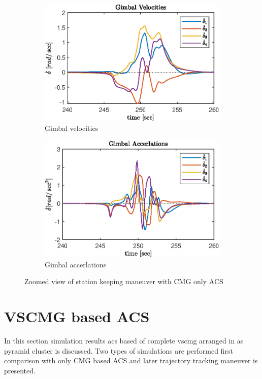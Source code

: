 \begin{figure}[H]
\begin{subfigure}[b]{0.49\columnwidth}
    \includegraphics[width=1\columnwidth]{figures/plots/CMG/cm_reg_w10_zoom_delta_dot.eps}
    \caption{Gimbal velocities}
    \label{plt:cm_reg_w10_zoom_delta_dot}
\end{subfigure}
  \begin{subfigure}[b]{0.49\columnwidth}
     \centering
    \includegraphics[width=1\columnwidth]{figures/plots/CMG/cm_reg_w10_zoom_delta_dot_dot.eps}
    \caption{Gimbal accerlations}
    \label{plt:cm_reg_w10_zoom_delta_dot_dot}
\end{subfigure}
\caption{Zoomed view of station keeping maneuver with CMG only ACS}
\label{plt:zoom_plots_omega_sing}

\end{figure}

\section{VSCMG based ACS}
In this section simulation results \acrlong{acs} based of complete \acrlong{vscmg} arranged in as pyramid cluster is discussed. Two types of simulations are performed first comparison with only CMG based ACS and later trajectory tracking maneuver is presented.

